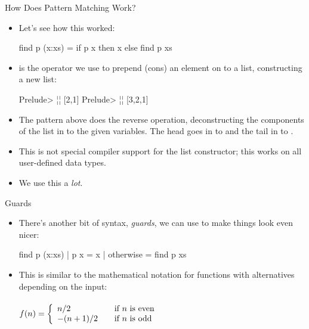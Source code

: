 \documentclass[xcolor=dvipsnames]{beamer}          %
\newcommand{\lH}[1]{\color{MidnightBlue}{#1}}
\begin{document}
\begin{frame}[fragile]{How Does Pattern Matching Work?}
\begin{itemize}
    \item Let's see how this worked:
        \begin{hlisting}
            find p (x:xs) = if p x then x else find p xs
        \end{hlisting}
    \item \T{\lH{:}} is the operator we use to prepend (cons) an element on to
        a list, constructing a new list:
        \begin{olisting}
            Prelude> ¦\lH{2:1:[]}¦
            [2,1]
            Prelude> ¦\lH{3:[2,1]}¦
            [3,2,1]
        \end{olisting}
    \item The pattern \T{\lH{x:xs}} above does the reverse operation,
        deconstructing the components of the list in to the given variables.
        The head goes in to  and the tail in to .
    \item This is not special compiler support for the list constructor;
        this works on all user-defined data types.
    \item We use this a \emph{lot}.
\end{itemize}
\end{frame}


\begin{frame}[fragile]{Guards}
\begin{itemize}
    \item There's another bit of syntax, \emph{guards}, we can use to
        make things look even nicer:
        \begin{hlisting}
            find p (x:xs) | p x       = x
                          | otherwise = find p xs
        \end{hlisting}
    \item This is similar to the mathematical notation for functions
        with alternatives depending on the input:\\
            \quad\\
            \quad $f(n) = \left\{
                \begin{array}{l l}
                    n / 2     & \quad \text{if $n$ is even}\\
                    -(n+1)/2   & \quad \text{if $n$ is odd}
                \end{array}
            \right.$
\end{itemize}
\end{frame}
\end{document}
